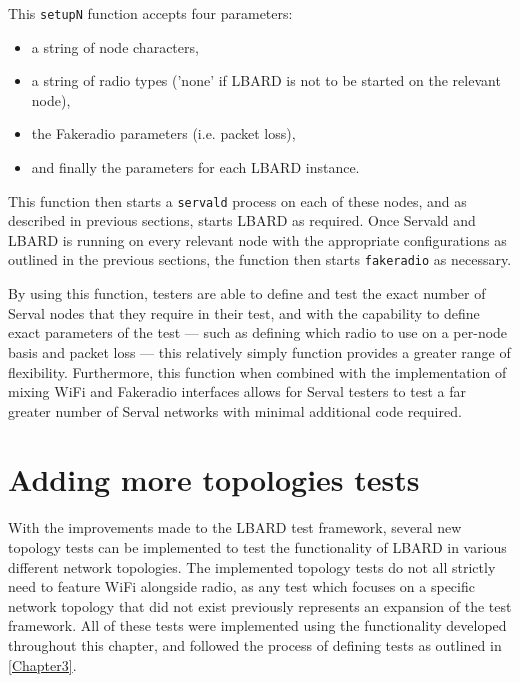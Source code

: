 This \texttt{setupN} function accepts four parameters:
\begin{itemize}
    \item a string of node characters, 
    \item a string of radio types ('none' if LBARD is not to be started on the relevant node), 
    \item the Fakeradio parameters (i.e. packet loss), 
    \item and finally the parameters for each LBARD instance.
\end{itemize}

This function then starts a \texttt{servald} process on each of these nodes, and as described in previous sections, starts LBARD as required.
Once Servald and LBARD is running on every relevant node with the appropriate configurations as outlined in the previous sections, the function then starts \texttt{fakeradio} as necessary.

By using this function, testers are able to define and test the exact number of Serval nodes that they require in their test, and with the capability to define exact parameters of the test — such as defining which radio to use on a per-node basis and packet loss — this relatively simply function provides a greater range of flexibility.
Furthermore, this function when combined with the implementation of mixing WiFi and Fakeradio interfaces allows for Serval testers to test a far greater number of Serval networks with minimal additional code required.


\section{Adding more topologies tests}
With the improvements made to the LBARD test framework, several new topology tests can be implemented to test the functionality of LBARD in various different network topologies.
The implemented topology tests do not all strictly need to feature WiFi alongside radio, as any test which focuses on a specific network topology that did not exist previously represents an expansion of the test framework.
All of these tests were implemented using the functionality developed throughout this chapter, and followed the process of defining tests as outlined in \chaptername{ \ref{Chapter3}}.

